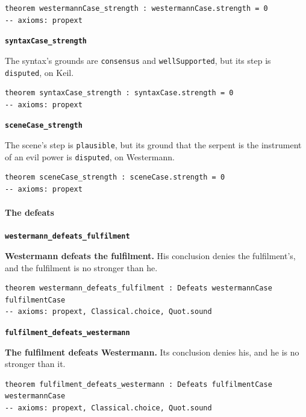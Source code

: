 \documentclass[11pt]{article}
\begin{document}
{\small\begin{verbatim}
theorem westermannCase_strength : westermannCase.strength = 0
-- axioms: propext
\end{verbatim}}
\par\medskip\noindent\textbf{\texttt{syntax\allowbreak{}Case\_\allowbreak{}strength}}\par\nobreak\noindent
The syntax’s grounds are \texttt{consensus} and \texttt{well\allowbreak{}Supported}, but its step is \texttt{disputed}, on Keil.

{\small\begin{verbatim}
theorem syntaxCase_strength : syntaxCase.strength = 0
-- axioms: propext
\end{verbatim}}
\par\medskip\noindent\textbf{\texttt{scene\allowbreak{}Case\_\allowbreak{}strength}}\par\nobreak\noindent
The scene’s step is \texttt{plausible}, but its ground that the serpent is the instrument of an evil power is \texttt{disputed}, on Westermann.

{\small\begin{verbatim}
theorem sceneCase_strength : sceneCase.strength = 0
-- axioms: propext
\end{verbatim}}
\paragraph*{The defeats}
\leavevmode\par\nobreak
\par\medskip\noindent\textbf{\texttt{westermann\_\allowbreak{}defeats\_\allowbreak{}fulfilment}}\par\nobreak\noindent
\textbf{Westermann defeats the fulfilment.} His conclusion denies the fulfilment’s, and the fulfilment is no stronger than he.

{\small\begin{verbatim}
theorem westermann_defeats_fulfilment : Defeats westermannCase fulfilmentCase
-- axioms: propext, Classical.choice, Quot.sound
\end{verbatim}}
\par\medskip\noindent\textbf{\texttt{fulfilment\_\allowbreak{}defeats\_\allowbreak{}westermann}}\par\nobreak\noindent
\textbf{The fulfilment defeats Westermann.} Its conclusion denies his, and he is no stronger than it.

{\small\begin{verbatim}
theorem fulfilment_defeats_westermann : Defeats fulfilmentCase westermannCase
-- axioms: propext, Classical.choice, Quot.sound
\end{verbatim}}
\end{document}
